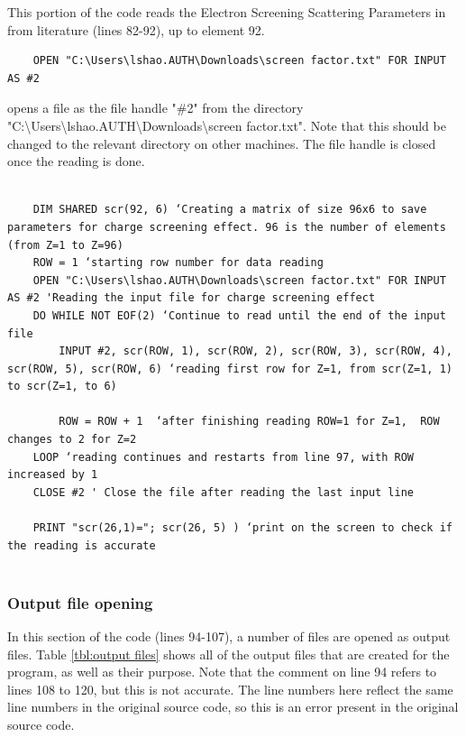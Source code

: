 \documentclass[10pt, reqno]{exam}
\begin{document}
{This portion of the code reads the Electron Screening Scattering Parameters in from literature (lines 82-92), up to element 92. \par

\vspace{0.5 cm}

\begin{verbatim}
    OPEN "C:\Users\lshao.AUTH\Downloads\screen factor.txt" FOR INPUT AS #2
\end{verbatim}

opens a file as the file handle "\#2" from the directory "C:\textbackslash Users\textbackslash lshao.AUTH\textbackslash Downloads\textbackslash screen factor.txt". Note that this should be changed to the relevant directory on other machines. The file handle is closed once the reading is done. \par

\begin{verbatim}

    DIM SHARED scr(92, 6) ‘Creating a matrix of size 96x6 to save parameters for charge screening effect. 96 is the number of elements (from Z=1 to Z=96)
    ROW = 1 ‘starting row number for data reading
    OPEN "C:\Users\lshao.AUTH\Downloads\screen factor.txt" FOR INPUT AS #2 'Reading the input file for charge screening effect
    DO WHILE NOT EOF(2) ‘Continue to read until the end of the input file
        INPUT #2, scr(ROW, 1), scr(ROW, 2), scr(ROW, 3), scr(ROW, 4), scr(ROW, 5), scr(ROW, 6) ‘reading first row for Z=1, from scr(Z=1, 1) to scr(Z=1, to 6)
    
        ROW = ROW + 1  ‘after finishing reading ROW=1 for Z=1,  ROW changes to 2 for Z=2
    LOOP ‘reading continues and restarts from line 97, with ROW increased by 1
    CLOSE #2 ' Close the file after reading the last input line
    
    PRINT "scr(26,1)="; scr(26, 5) ) ‘print on the screen to check if the reading is accurate
    
\end{verbatim}
\subsubsection{Output file opening}

In this section of the code (lines 94-107), a number of files are opened as output files. Table \ref{tbl:output files} shows all of the output files that are created for the program, as well as their purpose. Note that the comment on line 94 refers to lines 108 to 120, but this is not accurate. The line numbers here reflect the same line numbers in the original source code, so this is an error present in the original source code. \par

}
\end{document}
